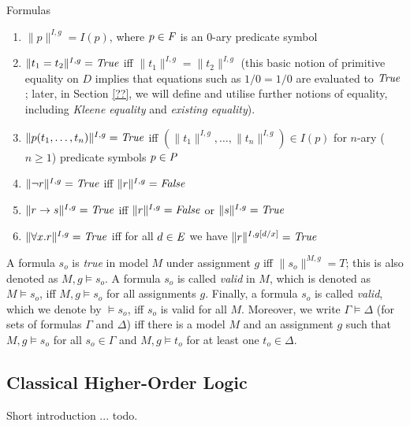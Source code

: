 \begin{definition}
\begin{description}
\item{Formulas}
\begin{enumerate}
\item $\| p \|^{I,g} = I(p)$, where $p\in\F$ is an 0-ary predicate
  symbol
\item $\| t_1 = t_2 \|^{I,g} = \True$ iff $\| t_1 \|^{I,g} = \| t_2
  \|^{I,g}$ (this basic notion of primitive equality on $D$ implies that equations such as $1/0 = 1/0$ are
  evaluated to $\True$; later, in Section \ref{??}, we will
  define and utilise further notions of equality, including \emph{Kleene equality}
  and \emph{existing equality}).
\item $\| p(t_1,\ldots,t_n) \|^{I,g} = \True$ iff $(\| t_1 \|^{I,g},\ldots,\|
  t_n \|^{I,g}) \in I(p)$ for $n$-ary ($n\geq 1$) predicate symbols
  $p\in\P$
\item $\| \neg r \|^{I,g} = \True$ iff $\| r \|^{I,g} = \False$
\item $\| r \Impl s \|^{I,g} = \True$ iff $\| r \|^{I,g} = \False$
  or $\| s \|^{I,g} = \True$
\item $\| \forall x. r  \|^{I,g} = \True$ iff for all $d \in \ex$ we
  have $\|  r  \|^{I,g[d/x]} = \True$ %
\end{enumerate}
\end{description}

\end{definition}
 

\begin{definition}\label{homlvalid}
  A formula $s_o$ is \emph{true} in model $M$ under assignment $g$ iff
  $\|s_o\|^{M,g} = T$; this is also denoted as $M,g \models s_o$.  A
  formula $s_o$ is called \emph{valid} in $M$, which is denoted as
  $M \models s_o$, iff $M,g \models s_o$ for all assignments
  $g$. Finally, a formula $s_o$ is called \emph{valid}, which we
  denote by $\models s_o$, iff $s_o$ is valid for all $M$. Moreover,
  we write $\Gamma\models \Delta$ (for sets of formulas $\Gamma$ and
  $\Delta$) iff there is a model $M$ and an assignment $g$ such that
  $M,g \models s_o$ for all $s_o\in \Gamma$ and $M,g \models t_o$ for
  at least one $t_o\in \Delta$.
\end{definition}


\subsection{Classical Higher-Order Logic}
Short introduction ... todo.

